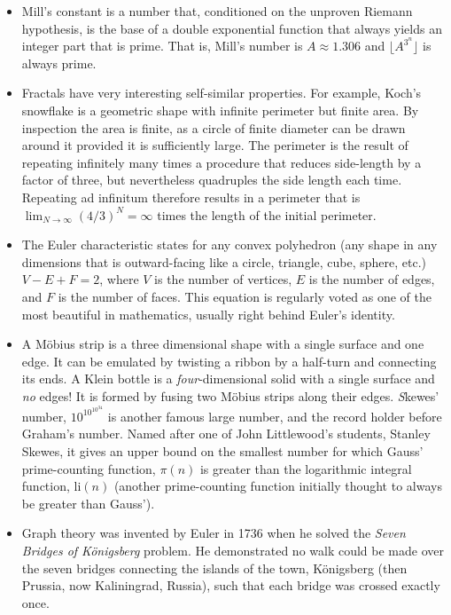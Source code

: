 \documentclass[11pt]{amsart}
\begin{document}
\begin{itemize}
\item Mill's constant is a number that, conditioned on the unproven Riemann hypothesis, is the base of a double exponential function that always yields an integer part that is prime. That is, Mill's number is $A \approx 1.306$ and $\lfloor A^{3^n}\rfloor$ is always prime.
\item Fractals have very interesting self-similar properties. For example, Koch's snowflake is a geometric shape with infinite perimeter but finite area. By inspection the area is finite, as a circle of finite diameter can be drawn around it provided it is sufficiently large. The perimeter is the result of repeating infinitely many times a procedure that reduces side-length by a factor of three, but nevertheless quadruples the side length each time. Repeating ad infinitum therefore results in a perimeter that is $\lim_{N \to \infty}(4/3)^N = \infty$ times the length of the initial perimeter.
\item The Euler characteristic states for any convex polyhedron (any shape in any dimensions that is outward-facing like a circle, triangle, cube, sphere, etc.) $V - E + F = 2$, where $V$ is the number of vertices, $E$ is the number of edges, and $F$ is the number of faces. This equation is regularly voted as one of the most beautiful in mathematics, usually right behind Euler's identity.
\item A M\"obius strip is a three dimensional shape with a single surface and one edge. It can be emulated by twisting a ribbon by a half-turn and connecting its ends. A Klein bottle is a \emph{four}-dimensional solid with a single surface and \emph{no} edges! It is formed by fusing two M\"obius strips along their edges.
\emph Skewes' number, $10^{10^{10^{34}}}$ is another famous large number, and the record holder before Graham's number. Named after one of John Littlewood's students, Stanley Skewes, it gives an upper bound on the smallest number for which Gauss' prime-counting function, $\pi(n)$ is greater than the logarithmic integral function, $\text{li}(n)$ (another prime-counting function initially thought to always be greater than Gauss').
\item Graph theory was invented by Euler in 1736 when he solved the \emph{Seven Bridges of K\"onigsberg} problem. He demonstrated no walk could be made over the seven bridges connecting the islands of the town, K\"onigsberg (then Prussia, now Kaliningrad, Russia), such that each bridge was crossed exactly once.
\end{itemize}
\end{document}
